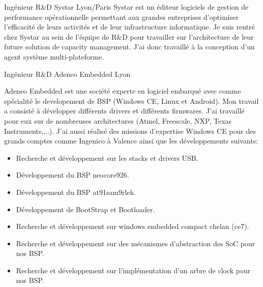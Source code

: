 \documentclass[11pt,a4paper,sans]{moderncv}
\begin{document}
{Ing\'enieur R\&D}
{Systar}
{Lyon/Paris}
{}
{Systar est un \'editeur logiciels de gestion de performance 
op\'erationnelle permettant aux grandes entreprises d'optimiser l'efficacit\'e
de leurs activit\'es et de leur infrastructure informatique. 
Je suis rentr\'e chez Systar au sein de l'\'equipe de R\&D pour travailler sur 
l'architecture de leur future solution de capacity management. J'ai donc
travaill\'e \`a la conception d'un agent syst\`eme multi-plateforme.
}

{Ing\'enieur R\&D}
{Adeneo Embedded}
{Lyon}
{}
{Adeneo Embedded est une soci\'et\'e experte en logiciel embarqu\'e 
avec comme sp\'ecialit\'e le developement de BSP (Windows CE, Linux et
Android).
Mon travail a consist\'e \`a d\'evelopper diff\'erents drivers et diff\'erents
firmwares. J'ai travaill\'e pour eux sur de nombreuses architectures 
(Atmel, Freescale, NXP, Texas Instruments,...).
J'ai aussi r\'ealis\'e des missions d'expertise Windows CE pour des 
grands comptes comme Ingenico \`a Valence ainsi que les d\'eveloppements suivants:
\begin{itemize}
\item Recherche et d\'eveloppement sur les stacks et drivers USB.
\item D\'eveloppement du BSP neocore926.
\item D\'eveloppement du BSP at91sam9rlek.
\item D\'eveloppement de BootStrap et Bootloader.
\item Recherche et d\'eveloppement sur windows embedded compact chelan (ce7).
\item Recherche et d\'eveloppement sur des m\'ecanismes d'abstraction des SoC pour nos BSP.
\item Recherche et d\'eveloppement sur l'impl\'ementation d'un arbre de clock pour nos BSP.
\end{itemize}
}
\end{document}
